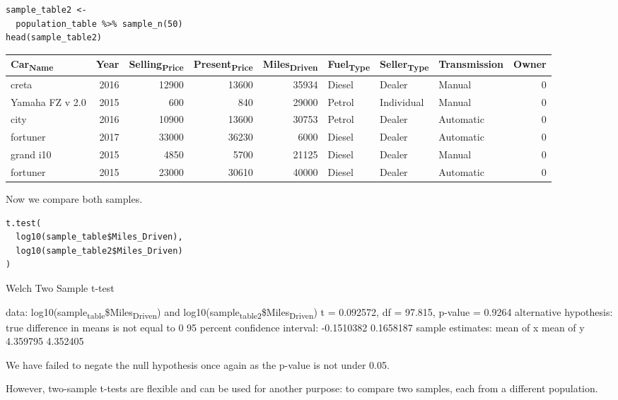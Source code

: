 \documentclass[11pt]{article}
\begin{document}
\begin{verbatim}
sample_table2 <-
  population_table %>% sample_n(50)
head(sample_table2)
\end{verbatim}

\begin{org}
\begin{center}
\begin{tabular}{lrrrrlllr}
Car\textsubscript{Name} & Year & Selling\textsubscript{Price} & Present\textsubscript{Price} & Miles\textsubscript{Driven} & Fuel\textsubscript{Type} & Seller\textsubscript{Type} & Transmission & Owner\\
\hline
creta & 2016 & 12900 & 13600 & 35934 & Diesel & Dealer & Manual & 0\\
Yamaha FZ  v 2.0 & 2015 & 600 & 840 & 29000 & Petrol & Individual & Manual & 0\\
city & 2016 & 10900 & 13600 & 30753 & Petrol & Dealer & Automatic & 0\\
fortuner & 2017 & 33000 & 36230 & 6000 & Diesel & Dealer & Automatic & 0\\
grand i10 & 2015 & 4850 & 5700 & 21125 & Diesel & Dealer & Manual & 0\\
fortuner & 2015 & 23000 & 30610 & 40000 & Diesel & Dealer & Automatic & 0\\
\end{tabular}
\end{center}
\end{org}

Now we compare both samples.
\begin{verbatim}
t.test(
  log10(sample_table$Miles_Driven),
  log10(sample_table2$Miles_Driven)
)
\end{verbatim}

\begin{org}


Welch Two Sample t-test

data:  log10(sample\textsubscript{table}\$Miles\textsubscript{Driven}) and log10(sample\textsubscript{table2}\$Miles\textsubscript{Driven})
t = 0.092572, df = 97.815, p-value = 0.9264
alternative hypothesis: true difference in means is not equal to 0
95 percent confidence interval:
 -0.1510382  0.1658187
sample estimates:
mean of x mean of y
 4.359795  4.352405
\end{org}

We have failed to negate the null hypothesis once again as the p-value is not under 0.05.

However, two-sample t-tests are flexible and can be used for another purpose: to compare two samples, each from a different population.
\end{document}
